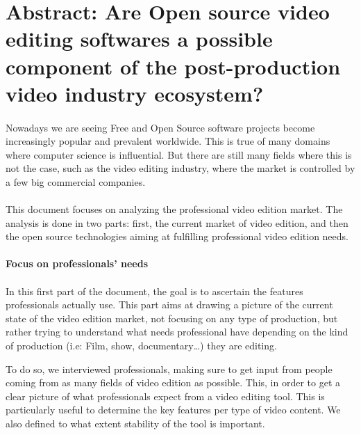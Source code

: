 \newpage\section*{Abstract: Are Open source video editing softwares
a possible
        component of the post-production video industry ecosystem?}

\paragraph{}

Nowadays we are seeing Free and Open Source software projects become
increasingly popular and prevalent worldwide. This is true of many
domains where computer science is influential. But there are still many
fields where this is not the case, such as the video editing industry,
where the market is controlled by a few big commercial companies.

\paragraph{}

This document focuses on analyzing the professional video edition
market. The analysis is done in two parts: first, the current market of
video edition, and then the open source technologies aiming at fulfilling
professional video edition needs.


\paragraph{Focus on professionals' needs}

\paragraph{}

In this first part of the document, the goal is to ascertain the features
professionals actually use. This part aims at drawing a picture of the
current state of the video edition market, not focusing on any type of
production, but rather trying to understand what needs professional have
depending on the kind of production (i.e: Film, show, documentary\ldots)
they are editing.

To do so, we interviewed professionals, making sure to get input from
people coming from as many fields of video edition as possible. This,
in order to get a clear picture of what professionals expect from a video
editing tool.  This is particularly useful to determine the key features
per type of video content.  We also defined to what extent stability of
the tool is important.

